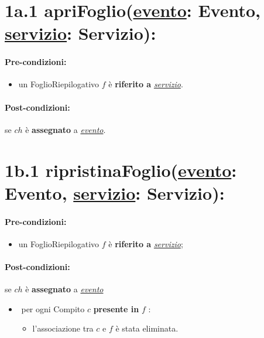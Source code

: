 \section*{1a.1 apriFoglio(\underline{evento}: Evento, \underline{servizio}: Servizio):}

\paragraph{Pre-condizioni:}

\begin{itemize}
  \item un FoglioRiepilogativo $f$ è \textbf{riferito a} \underline{\textit{servizio}}.
\end{itemize}

\paragraph{Post-condizioni:} se $ch$ è \textbf{assegnato} a \underline{\textit{evento}}.

\section*{1b.1 ripristinaFoglio(\underline{evento}: Evento, \underline{servizio}: Servizio):}

\paragraph{Pre-condizioni:}

\begin{itemize}
  \item un FoglioRiepilogativo $f$ è \textbf{riferito a} \underline{\textit{servizio}};
\end{itemize}

\paragraph{Post-condizioni:} se $ch$ è \textbf{assegnato} a \underline{\textit{evento}}

\begin{itemize}
    \item \textlangle $ $ per ogni Compito $c$ \textbf{presente in} $f$ \textrangle:
    \begin{itemize}
        \item l'associazione tra $c$ e $f$ è stata eliminata.
    \end{itemize}
\end{itemize}

